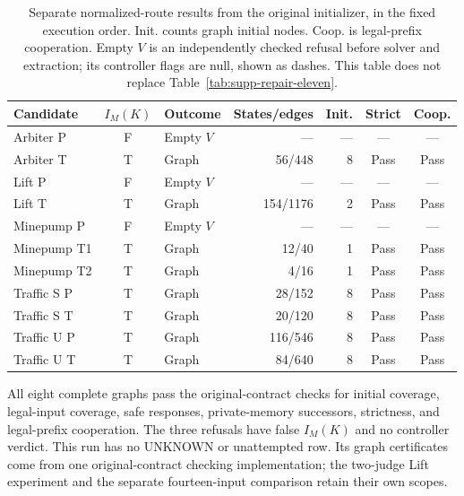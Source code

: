 \begin{table}[htbp]
\centering\small
\caption{Separate normalized-route results from the original initializer,
in the fixed execution order. Init. counts graph initial nodes. Coop. is
legal-prefix cooperation. Empty $V$ is an independently checked refusal
before solver and extraction; its controller flags are null, shown as
dashes. This table does not replace Table~\ref{tab:supp-repair-eleven}.}
\label{tab:supp-normalized-eleven}
\begin{tabular}{@{}lclrrcc@{}}
\toprule
Candidate & $I_M(K)$ & Outcome & States/edges & Init. & Strict & Coop.\\
\midrule
Arbiter P & F & Empty $V$ & --- & --- & --- & ---\\
Arbiter T & T & Graph & 56/448 & 8 & Pass & Pass\\
Lift P & F & Empty $V$ & --- & --- & --- & ---\\
Lift T & T & Graph & 154/1176 & 2 & Pass & Pass\\
Minepump P & F & Empty $V$ & --- & --- & --- & ---\\
Minepump T1 & T & Graph & 12/40 & 1 & Pass & Pass\\
Minepump T2 & T & Graph & 4/16 & 1 & Pass & Pass\\
Traffic S P & T & Graph & 28/152 & 8 & Pass & Pass\\
Traffic S T & T & Graph & 20/120 & 8 & Pass & Pass\\
Traffic U P & T & Graph & 116/546 & 8 & Pass & Pass\\
Traffic U T & T & Graph & 84/640 & 8 & Pass & Pass\\
\bottomrule
\end{tabular}
\end{table}

All eight complete graphs pass the original-contract checks for initial
coverage, legal-input coverage, safe responses, private-memory successors,
strictness, and legal-prefix cooperation. The three refusals have false
$I_M(K)$ and no controller verdict. This run has
no UNKNOWN or unattempted row. Its graph certificates come from one
original-contract checking implementation; the two-judge Lift experiment
and the separate fourteen-input comparison retain their own scopes.

